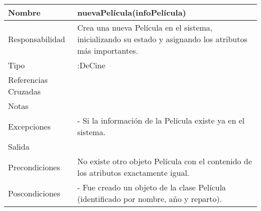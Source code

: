 \documentclass{article}
\begin{document}
\begin{table}[h]
\begin{tabular}{|l|l|l|l|l|l|}
\hline
\multicolumn{2}{|p{3cm}|}{Nombre} & \multicolumn{3}{p{8cm}|}{\textbf{nuevaPelícula(infoPelícula)}}\\
\hline
\multicolumn{2}{|p{3cm}|}{Responsabilidad} & \multicolumn{4}{p{8cm}|}{Crea una nueva Película en el sistema, inicializando su estado y asignando los atributos más importantes.} \\
\hline
\multicolumn{2}{|p{3cm}|}{Tipo} & \multicolumn{4}{p{8cm}|}{:DeCine} \\
\hline
\multicolumn{2}{|p{3cm}|}{Referencias Cruzadas} & \multicolumn{4}{p{8cm}|}{} \\
\hline
\multicolumn{2}{|p{3cm}|}{Notas} & \multicolumn{4}{p{8cm}|}{} \\
\hline
\multicolumn{2}{|p{3cm}|}{Excepciones} & \multicolumn{4}{p{8cm}|}{- Si la información de la Película existe ya en el sistema.} \\
\hline
\multicolumn{2}{|p{3cm}|}{Salida} & \multicolumn{4}{p{8cm}|}{} \\
\hline
\multicolumn{2}{|p{3cm}|}{Precondiciones} & \multicolumn{4}{p{8cm}|}{No existe otro objeto Película con el contenido de los atributos exactamente igual.} \\
\hline
\multicolumn{2}{|p{3cm}|}{Poscondiciones} & \multicolumn{4}{p{8cm}|}{- Fue creado un objeto de la clase Película (identificado por nombre, año y reparto).} \\
\hline
\end{tabular}
\end{table}
\end{document}
